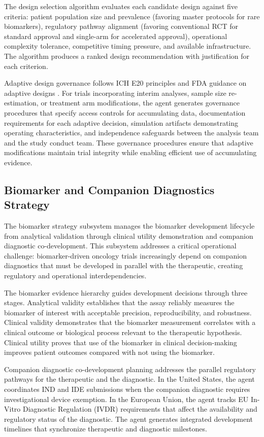 The design selection algorithm evaluates each candidate design against five criteria:
patient population size and prevalence (favoring master protocols for rare biomarkers),
regulatory pathway alignment (favoring conventional RCT for standard approval and
single-arm for accelerated approval), operational complexity tolerance, competitive
timing pressure, and available infrastructure. The algorithm produces a ranked design
recommendation with justification for each criterion.

Adaptive design governance follows ICH E20 principles \cite{ich-e20} and FDA guidance
on adaptive designs \cite{fda-adaptive-designs}. For trials incorporating interim
analyses, sample size re-estimation, or treatment arm modifications, the agent
generates governance procedures that specify access controls for accumulating data,
documentation requirements for each adaptive decision, simulation artifacts
demonstrating operating characteristics, and independence safeguards between the
analysis team and the study conduct team. These governance procedures ensure that
adaptive modifications maintain trial integrity while enabling efficient use of
accumulating evidence.

\subsection{Biomarker and Companion Diagnostics Strategy}

The biomarker strategy subsystem manages the biomarker development lifecycle from
analytical validation through clinical utility demonstration and companion diagnostic
co-development. This subsystem addresses a critical operational challenge: biomarker-driven
oncology trials increasingly depend on companion diagnostics that must be developed in
parallel with the therapeutic, creating regulatory and operational interdependencies.

The biomarker evidence hierarchy guides development decisions through three stages.
Analytical validity establishes that the assay reliably measures the biomarker of
interest with acceptable precision, reproducibility, and robustness. Clinical validity
demonstrates that the biomarker measurement correlates with a clinical outcome or
biological process relevant to the therapeutic hypothesis. Clinical utility proves that
use of the biomarker in clinical decision-making improves patient outcomes compared with
not using the biomarker.

Companion diagnostic co-development planning addresses the parallel regulatory pathways
for the therapeutic and the diagnostic. In the United States, the agent coordinates IND
and IDE submissions when the companion diagnostic requires investigational device
exemption. In the European Union, the agent tracks EU In-Vitro Diagnostic Regulation
(IVDR) requirements that affect the availability and regulatory status of the diagnostic.
The agent generates integrated development timelines that synchronize therapeutic and
diagnostic milestones.

